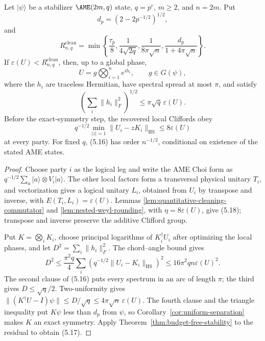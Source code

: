 \begin{theorem}
\label{thm:cleaning-global-rounding}
Let \(\lvert\psi\rangle\) be a stabilizer \(\AME(2m,q)\) state,
\(q=p^e\), \(m\geq2\), and \(n=2m\).  Put
\[
 d_p=(2-2p^{-1/2})^{1/2},
\]
and
\[
 R^{\mathrm{clean}}_{n,q}=\min\left\{
  \frac{\tau_p}{8},\frac1{4\sqrt{2q}},
  \frac1{8\pi\sqrt n},
  \frac{d_p}{1+4\pi\sqrt n}
 \right\}.                                           \tag{5.16}
\]
If \(\varepsilon(U)<R^{\mathrm{clean}}_{n,q}\), then, up to a global
phase,
\[
 U=g\bigotimes_{i=1}^n e^{ih_i},\qquad g\in G(\psi),
\]
where the \(h_i\) are traceless Hermitian, have spectral spread at most
\(\pi\), and satisfy
\[
 \left(\sum_i\lVert h_i\rVert_F^2\right)^{1/2}
 \leq\pi\sqrt q\,\varepsilon(U).                     \tag{5.17}
\]
Before the exact-symmetry step, the recovered local Cliffords obey
\[
 q^{-1/2}\min_{|z|=1}\lVert U_i-zK_i\rVert_{\mathrm{HS}}
 \leq8\varepsilon(U)                                 \tag{5.18}
\]
at every party.  For fixed \(q\), (5.16) has order \(n^{-1/2}\),
conditional on existence of the stated AME states.
\end{theorem}

\begin{proof}
Choose party \(i\) as the logical leg and write the AME Choi form as
\(q^{-1/2}\sum_a|a\rangle\otimes V_i|a\rangle\).  The other local
factors form a transversal physical unitary \(T_i\), and vectorization
gives a logical unitary \(L_i\), obtained from \(U_i\) by transpose and
inverse, with \(E(T_i,L_i)=\varepsilon(U)\).  Lemmas
\ref{lem:quantitative-cleaning-commutator} and
\ref{lem:nested-weyl-rounding}, with \(\eta=8\varepsilon(U)\), give
(5.18); transpose and inverse preserve the additive Clifford group.

Put \(K=\bigotimes_iK_i\), choose principal logarithms of
\(K_i^\dagger U_i\) after optimizing the local phases, and let
\(D^2=\sum_i\lVert h_i\rVert_F^2\).  The chord--angle bound gives
\[
 D^2\leq\frac{\pi^2q}{4}\sum_i
  \left(q^{-1/2}\lVert U_i-K_i\rVert_{\mathrm{HS}}\right)^2
 \leq16\pi^2qn\varepsilon(U)^2.                      \tag{5.19}
\]
The second clause of (5.16) puts every spectrum in an arc of length
\(\pi\); the third gives \(D\leq\sqrt q/2\).  Two-uniformity gives
\(\lVert(K^\dagger U-I)\psi\rVert\leq D/\sqrt q
\leq4\pi\sqrt n\,\varepsilon(U)\).  The fourth clause and the triangle
inequality put \(K\psi\) less than \(d_p\) from \(\psi\), so
Corollary~\ref{cor:uniform-separation} makes \(K\) an exact symmetry.
Apply Theorem~\ref{thm:budget-free-stability} to the residual to obtain
(5.17).
\end{proof}

